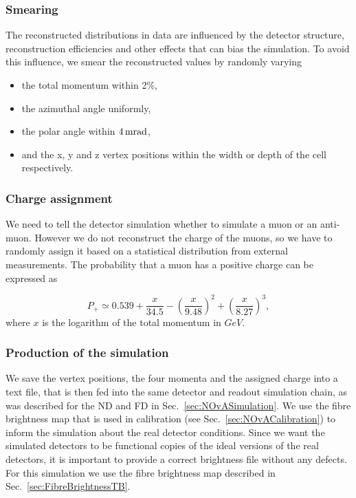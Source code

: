 \subsubsection*{Smearing}
The reconstructed distributions in data are influenced by the detector structure, reconstruction efficiencies and other effects that can bias the simulation. To avoid this influence, we smear the reconstructed values by randomly varying
\begin{itemize}
\item the total momentum within 2\%,
\item the azimuthal angle uniformly,
\item the polar angle within $\unit[4]{mrad}$,
\item and the x, y and z vertex positions within the width or depth of the cell respectively.
\end{itemize}

\subsubsection*{Charge assignment}
We need to tell the detector simulation whether to simulate a muon or an anti-muon. However we do not reconstruct the charge of the muons, so we have to randomly assign it based on a statistical distribution from external measurements. The probability that a muon has a positive charge can be expressed as \cite{NOvA-doc-51327} 


\begin{equation}
P_+ \simeq 0.539 + \frac{x}{34.5}-\left(\frac{x}{9.48}\right)^2 + \left(\frac{x}{8.27}\right)^3,
\end{equation}
where $x$ is the logarithm of the total momentum in $\unit{GeV}$.

\subsubsection*{Production of the simulation}
We save the vertex positions, the four momenta and the assigned charge into a text file, that is then fed into the same detector and readout simulation chain, as was described for the \gls{ND} and \gls{FD} in Sec.~\ref{sec:NOvASimulation}.  We use the fibre brightness map that is used in calibration (see Sec.~\ref{sec:NOvACalibration}) to inform the simulation about the real detector conditions. Since we want the simulated detectors to be functional copies of the ideal versions of the real detectors, it is important to provide a correct brightness file without any defects. For this simulation we use the fibre brightness map described in Sec.~\ref{sec:FibreBrightnessTB}.

